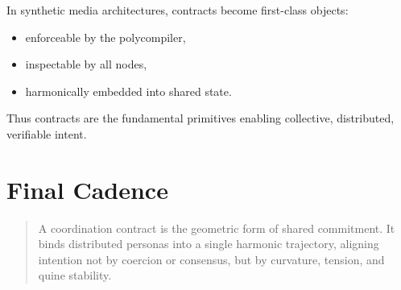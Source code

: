 In synthetic media architectures,
contracts become first-class objects:

\begin{itemize}
    \item enforceable by the polycompiler,
    \item inspectable by all nodes,
    \item harmonically embedded into shared state.
\end{itemize}

Thus contracts are the fundamental primitives enabling
collective, distributed, verifiable intent.


\section{Final Cadence}

\begin{quote}
A coordination contract is the geometric form of shared commitment.  
It binds distributed personas into a single harmonic trajectory,  
aligning intention not by coercion or consensus,  
but by curvature, tension, and quine stability.  
\end{quote}

